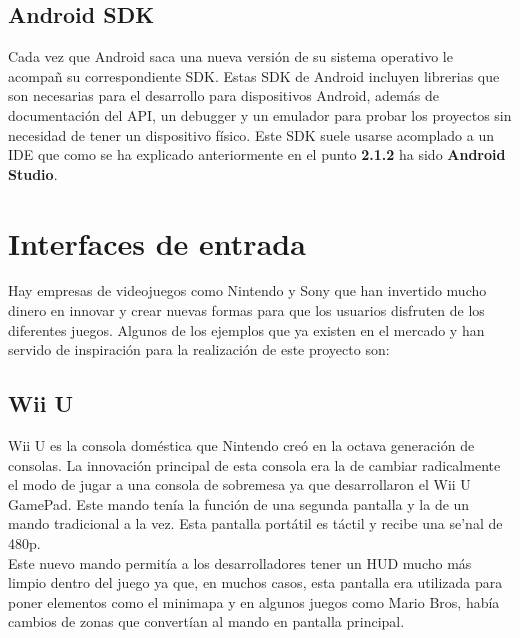 \subsection{Android SDK}
\label{cap2:subsec:android}

Cada vez que Android saca una nueva versi\'on de su sistema operativo le acompa\~n su correspondiente SDK. Estas SDK de Android incluyen librerias que son necesarias para el desarrollo para dispositivos Android, adem\'as de documentaci\'on del API, un debugger y un emulador para probar los proyectos sin necesidad de tener un dispositivo f\'isico. Este SDK suele usarse acomplado a un IDE que como se ha explicado anteriormente en el punto \textbf{2.1.2} ha sido \textbf{Android Studio}.

\section{Interfaces de entrada}

\label{cap2:sec:proyectos-similares}

Hay empresas de videojuegos como Nintendo y Sony que han invertido mucho dinero en innovar y crear nuevas formas para que los usuarios disfruten de los diferentes juegos. Algunos de los ejemplos que ya existen en el mercado y han servido de inspiraci\'on para la realizaci\'on de este proyecto son:

\subsection{Wii U}
\label{cap2:subsec:Wii U}

Wii U es la consola dom\'estica que Nintendo cre\'o en la octava generaci\'on de consolas. La innovaci\'on principal de esta consola era la de cambiar radicalmente el modo de jugar a una consola de sobremesa ya que desarrollaron el Wii U GamePad. Este mando ten\'ia la funci\'on de una segunda pantalla y la de un mando tradicional a la vez. Esta pantalla port\'atil es t\'actil y recibe una se'nal de 480p.
\\
 Este nuevo mando permit\'ia a los desarrolladores tener un HUD mucho m\'as limpio dentro del juego ya que, en muchos casos, esta pantalla era utilizada para poner elementos como el minimapa y en algunos juegos como Mario Bros, hab\'ia cambios de zonas que convert\'ian al mando en pantalla principal. \\

